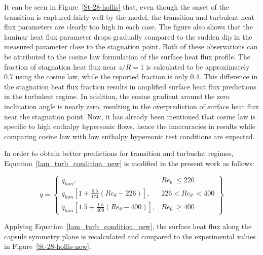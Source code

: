 \documentclass[%
 aip,
 amsmath,amssymb,
preprint,%
]{revtex4-1}
\begin{document}
It can be seen in Figure~\ref{St-28-hollis} that, even though the onset of the transition is captured fairly well by the model, the transition and turbulent heat flux parameters are clearly too high in each case. The figure also shows that the laminar heat flux parameter drops gradually compared to the sudden dip in the measured parameter close to the stagnation point. Both of these observations can be attributed to the cosine law formulation of the surface heat flux profile. The fraction of stagnation heat flux near $z/R = 1$ is calculated to be approximately 0.7 using the cosine law, while the reported fraction is only 0.4. This difference in the stagnation heat flux fraction results in amplified surface heat flux predictions in the turbulent regime. In addition, the cosine gradient around the zero inclination angle is nearly zero, resulting in the overprediction of surface heat flux near the stagnation point. Now, it has already been mentioned that cosine law is specific to high enthalpy hypersonic flows, hence the inaccuracies in results while comparing cosine law with low enthalpy hypersonic test conditions are expected. 

In order to obtain better predictions for transition and turbuelnt regimes, Equation~\eqref{lam_turb_condition_new} is modified in the present work as follows:

\begin{equation}
\dot{q} = 
\left\{
    \begin{array}{lr}
        \dot{q}_{lam}, & Re_\theta\ \leq 226\\
        \dot{q}_{lam}[1 + \frac{0.5}{174}(Re_\theta - 226)], & 226 < Re_\theta\ < 400 \\
        \dot{q}_{lam}[1.5 + \frac{1.5}{400}(Re_\theta - 400)], & Re_\theta\ \geq 400
    \end{array}
\right\}
\label{lam_turb_condition_new}
\end{equation}

Applying Equation~\eqref{lam_turb_condition_new}, the surface heat flux along the capsule symmetry plane is recalculated and compared to the experimental values in Figure~\ref{St-28-hollis-new}.
\end{document}
